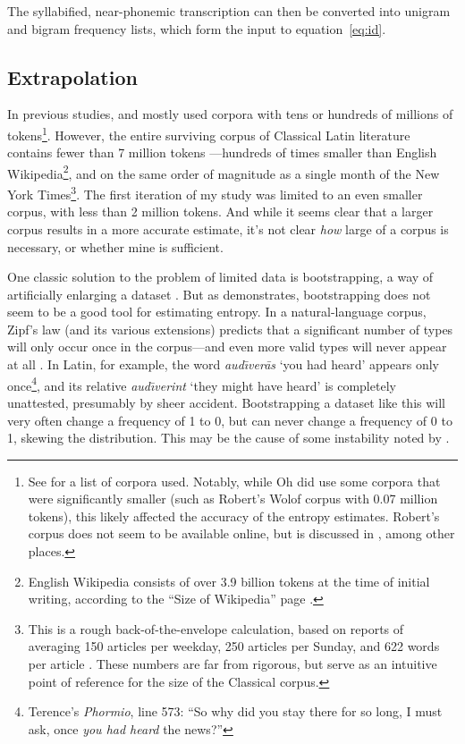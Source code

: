 \documentclass[12pt,twoside]{article}
\begin{document}
The syllabified, near-phonemic transcription can then be converted into unigram and bigram frequency lists, which form the input to equation~\ref{eq:id}.

\subsection{Extrapolation}
\label{subsec:extrapolate}

In previous studies, \citet{coupé} and \citet{oh} mostly used corpora with tens or hundreds of millions of tokens\footnote{See \citereset\cite[30-31]{oh} for a list of corpora used. Notably, while Oh did use some corpora that were significantly smaller (such as Robert's Wolof corpus with 0.07 million tokens), this likely affected the accuracy of the entropy estimates. Robert's corpus does not seem to be available online, but is discussed in \citet{robert}, among other places.}. However, the entire surviving corpus of Classical Latin literature contains fewer than 7 million tokens \citep{phi}---hundreds of times smaller than English Wikipedia\footnote{English Wikipedia consists of over 3.9 billion tokens at the time of initial writing, according to the ``Size of Wikipedia'' page \citep{wiki}.}, and on the same order of magnitude as a single month of the New York Times\footnote{This is a rough back-of-the-envelope calculation, based on reports of averaging 150 articles per weekday, 250 articles per Sunday, and 622 words per article \citep{meyer,menendez}. These numbers are far from rigorous, but serve as an intuitive point of reference for the size of the Classical corpus.}. The first iteration of my study was limited to an even smaller corpus, with less than 2 million tokens. And while it seems clear that a larger corpus results in a more accurate estimate, it's not clear \emph{how} large of a corpus is necessary, or whether mine is sufficient.

One classic solution to the problem of limited data is bootstrapping, a way of artificially enlarging a dataset \citep{oh,efron}. But as \citet[55-56]{oh} demonstrates, bootstrapping does not seem to be a good tool for estimating entropy. In a natural-language corpus, Zipf's law (and its various extensions) predicts that a significant number of types will only occur once in the corpus---and even more valid types will never appear at all \citep{davis}. In Latin, for example, the word \emph{aud\=\i{}ver\=as} `you had heard' appears only once\footnote{Terence's \emph{Phormio}, line 573: ``So why did you stay there for so long, I must ask, once \emph{you had heard} the news?''}, and its relative \emph{aud\=\i{}verint} `they might have heard' is completely unattested, presumably by sheer accident. Bootstrapping a dataset like this will very often change a frequency of 1 to 0, but can never change a frequency of 0 to 1, skewing the distribution. This may be the cause of some instability noted by \citet[56]{oh}.
\end{document}
